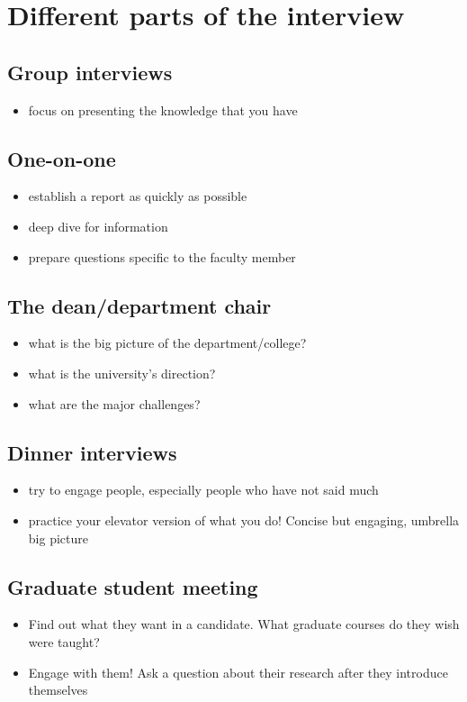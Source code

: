 \documentclass[12pt]{article}
\begin{document}
\section{Different parts of the interview}
\subsection{Group interviews}
\begin{itemize}
\item focus on presenting the knowledge that you have
\end{itemize}

\subsection{One-on-one}
\begin{itemize}
\item establish a report as quickly as possible
\item deep dive for information
\item prepare questions specific to the faculty member
\end{itemize}

\subsection{The dean/department chair}
\begin{itemize}
\item what is the big picture of the department/college?
\item what is the university's direction?
\item what are the major challenges?
\end{itemize}

\subsection{Dinner interviews}
\begin{itemize}
\item try to engage people, especially people who have not said much
\item practice your elevator version of what you do! Concise but
  engaging, umbrella big picture
\end{itemize}

\subsection{Graduate student meeting}
\begin{itemize}
\item Find out what they want in a candidate. What graduate courses do
  they wish were taught?
\item Engage with them! Ask a question about their research after they
  introduce themselves
\end{itemize}
\end{document}

